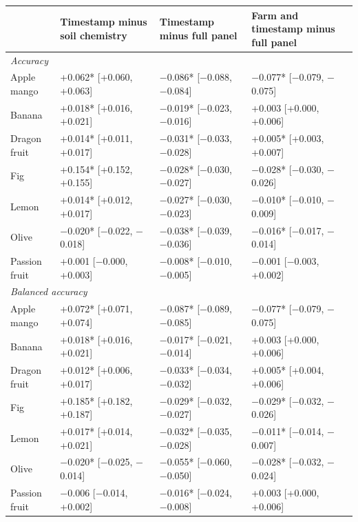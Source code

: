 \begin{tabular}{l>{\centering\arraybackslash}p{}>{\centering\arraybackslash}p{}>{\centering\arraybackslash}p{}}
\toprule
 & Timestamp minus soil chemistry & Timestamp minus full panel & Farm and timestamp minus full panel \\
\midrule
\multicolumn{4}{l}{\emph{Accuracy}} \\
Apple mango & +0.062* [+0.060, +0.063] & $-$0.086* [$-$0.088, $-$0.084] & $-$0.077* [$-$0.079, $-$0.075] \\
Banana & +0.018* [+0.016, +0.021] & $-$0.019* [$-$0.023, $-$0.016] & +0.003 [+0.000, +0.006] \\
Dragon fruit & +0.014* [+0.011, +0.017] & $-$0.031* [$-$0.033, $-$0.028] & +0.005* [+0.003, +0.007] \\
Fig & +0.154* [+0.152, +0.155] & $-$0.028* [$-$0.030, $-$0.027] & $-$0.028* [$-$0.030, $-$0.026] \\
Lemon & +0.014* [+0.012, +0.017] & $-$0.027* [$-$0.030, $-$0.023] & $-$0.010* [$-$0.010, $-$0.009] \\
Olive & $-$0.020* [$-$0.022, $-$0.018] & $-$0.038* [$-$0.039, $-$0.036] & $-$0.016* [$-$0.017, $-$0.014] \\
Passion fruit & +0.001 [$-$0.000, +0.003] & $-$0.008* [$-$0.010, $-$0.005] & $-$0.001 [$-$0.003, +0.002] \\
\multicolumn{4}{l}{\emph{Balanced accuracy}} \\
Apple mango & +0.072* [+0.071, +0.074] & $-$0.087* [$-$0.089, $-$0.085] & $-$0.077* [$-$0.079, $-$0.075] \\
Banana & +0.018* [+0.016, +0.021] & $-$0.017* [$-$0.021, $-$0.014] & +0.003 [+0.000, +0.006] \\
Dragon fruit & +0.012* [+0.006, +0.017] & $-$0.033* [$-$0.034, $-$0.032] & +0.005* [+0.004, +0.006] \\
Fig & +0.185* [+0.182, +0.187] & $-$0.029* [$-$0.032, $-$0.027] & $-$0.029* [$-$0.032, $-$0.026] \\
Lemon & +0.017* [+0.014, +0.021] & $-$0.032* [$-$0.035, $-$0.028] & $-$0.011* [$-$0.014, $-$0.007] \\
Olive & $-$0.020* [$-$0.025, $-$0.014] & $-$0.055* [$-$0.060, $-$0.050] & $-$0.028* [$-$0.032, $-$0.024] \\
Passion fruit & $-$0.006 [$-$0.014, +0.002] & $-$0.016* [$-$0.024, $-$0.008] & +0.003 [+0.000, +0.006] \\
\bottomrule
\end{tabular}
